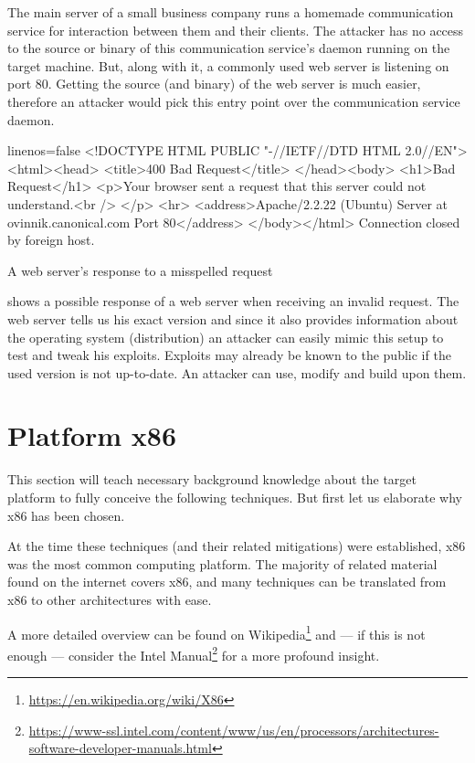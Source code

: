 \documentclass[article]{uibk}
\begin{document}
The main server of a small business company runs a homemade communication
service for interaction between them and their clients. The attacker has no
access to the source or binary of this communication service's daemon running
on the target machine. But, along with it, a commonly used web server is
listening on port 80. Getting the source (and binary) of the web server is much
easier, therefore an attacker would pick this entry point over the
communication service daemon.

\begin{listing}[h!]
    \begin{code*}{linenos=false}
        <!DOCTYPE HTML PUBLIC "-//IETF//DTD HTML 2.0//EN">
        <html><head>
        <title>400 Bad Request</title>
        </head><body>
        <h1>Bad Request</h1>
        <p>Your browser sent a request that this server could not understand.<br />
        </p>
        <hr>
        <address>Apache/2.2.22 (Ubuntu) Server at ovinnik.canonical.com Port 80</address>
        </body></html>
        Connection closed by foreign host.
    \end{code*}
    \caption{A web server's response to a misspelled request}
    \label{src:http_response}
\end{listing}

 shows a possible response of a web server when
receiving an invalid request. The web server tells us his exact version and
since it also provides information about the operating system (distribution) an
attacker can easily mimic this setup to test and tweak his exploits. Exploits
may already be known to the public if the used version is not up-to-date. An
attacker can use, modify and build upon them.

\section{Platform x86}
\label{sec:x86}

This section will teach necessary background knowledge about the target
platform to fully conceive the following techniques. But first let us elaborate
why x86 has been chosen.

At the time these techniques (and their related mitigations) were established,
x86 was the most common computing platform. The majority of related material
found on the internet covers x86, and many techniques can be translated from
x86 to other architectures with ease.

A more detailed overview can be found on
Wikipedia\footnote{\url{https://en.wikipedia.org/wiki/X86}} and --- if this is
not enough --- consider the Intel
Manual\footnote{\url{https://www-ssl.intel.com/content/www/us/en/processors/architectures-software-developer-manuals.html}}
for a more profound insight.
\end{document}
